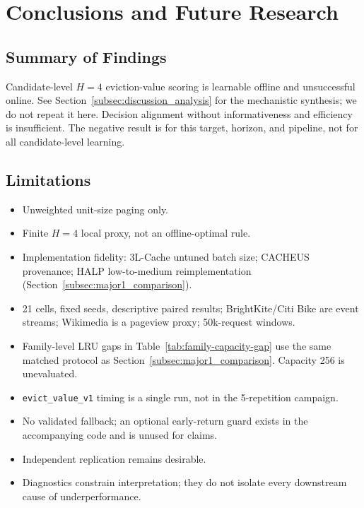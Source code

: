 \documentclass[preprint,12pt]{elsarticle}
\begin{document}
\section{Conclusions and Future Research}
\label{sec:conclusion}

\subsection{Summary of Findings}
\label{subsec:summary_findings}

Candidate-level $H=4$ eviction-value scoring is learnable offline and unsuccessful online. See Section~\ref{subsec:discussion_analysis} for the mechanistic synthesis; we do not repeat it here. Decision alignment without informativeness and efficiency is insufficient. The negative result is for this target, horizon, and pipeline, not for all candidate-level learning.

\subsection{Limitations}
\label{subsec:limitations}

\begin{itemize}
\item Unweighted unit-size paging only.
\item Finite $H=4$ local proxy, not an offline-optimal rule.
\item Implementation fidelity: 3L-Cache untuned batch size; CACHEUS provenance; HALP low-to-medium reimplementation (Section~\ref{subsec:major1_comparison}).
\item 21 cells, fixed seeds, descriptive paired results; BrightKite/Citi Bike are event streams; Wikimedia is a pageview proxy; 50k-request windows.
\item Family-level LRU gaps in Table~\ref{tab:family-capacity-gap} use the same matched protocol as Section~\ref{subsec:major1_comparison}. Capacity 256 is unevaluated.
\item \texttt{evict\_value\_v1} timing is a single run, not in the 5-repetition campaign.
\item No validated fallback; an optional early-return guard exists in the accompanying code and is unused for claims.
\item Independent replication remains desirable.
\item Diagnostics constrain interpretation; they do not isolate every downstream cause of underperformance.
\end{itemize}
\end{document}
